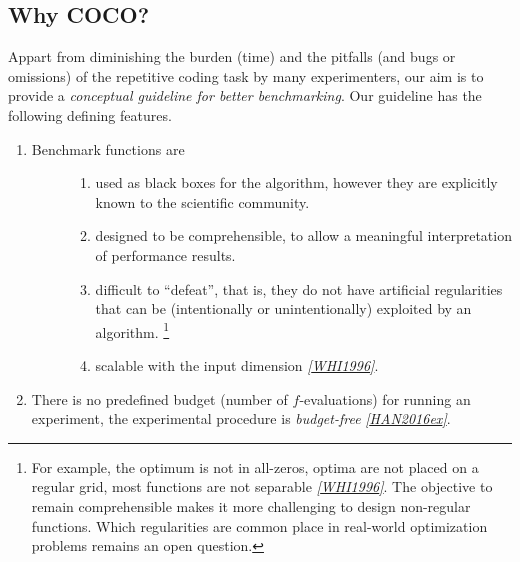 \documentclass[letterpaper,12pt,english]{article}
\begin{document}
\subsection{Why COCO?}
\label{index:why-coco}
Appart from diminishing the burden (time) and the pitfalls (and bugs
or omissions) of the repetitive coding task by many experimenters, our aim is to
provide a \emph{conceptual guideline for better benchmarking}. Our guideline has
the following defining features.
\begin{enumerate}
\item {} \begin{description}
\item[{Benchmark functions are}] \leavevmode\begin{enumerate}
\item {} 
used as black boxes for the algorithm, however they
are explicitly known to the scientific community.

\item {} 
designed to be comprehensible, to allow a meaningful
interpretation of performance results.

\item {} 
difficult to ``defeat'', that is, they do not
have artificial regularities that can be (intentionally or unintentionally)
exploited by an algorithm. \footnote[3]{
For example, the optimum is not in all-zeros, optima are not placed
on a regular grid, most functions are not separable \label{index:id17}{\hyperref[index:whi1996]{\emph{{[}WHI1996{]}}}}. The
objective to remain comprehensible makes it more challenging to design
non-regular functions. Which regularities are common place in real-world
optimization problems remains an open question.
}

\item {} 
scalable with the input dimension \label{index:id10}{\hyperref[index:whi1996]{\emph{{[}WHI1996{]}}}}.

\end{enumerate}

\end{description}

\item {} 
There is no predefined budget (number of \(f\)-evaluations) for running an
experiment, the experimental procedure is \emph{budget-free} \label{index:id11}{\hyperref[index:han2016ex]{\emph{{[}HAN2016ex{]}}}}.


\end{enumerate}
\end{document}
